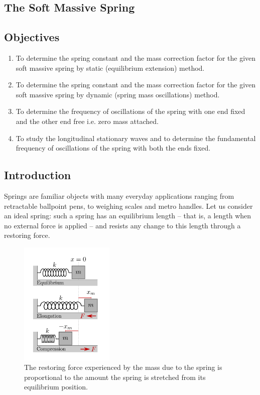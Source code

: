 \begin{refsection}
\chapter{The Soft Massive Spring}

\section*{Objectives}

\begin{enumerate}
\item To determine the spring constant and the mass correction factor for the given soft massive
spring by static (equilibrium extension) method.
\item To determine the spring constant and the mass correction factor for the given soft massive
spring by dynamic (spring mass oscillations) method.
\item To determine the frequency of oscillations of the spring with one end fixed and the other
end free i.e. zero mass attached.
\item To study the longitudinal stationary waves and to determine the fundamental frequency of
oscillations of the spring with both the ends fixed.
\end{enumerate}

\section*{Introduction}

Springs are familiar objects with many everyday applications ranging from retractable ballpoint pens, to weighing scales and metro handles. Let us consider an ideal spring: such a spring has an equilibrium length -- that is, a length when no external force is applied -- and resists any change to this length through a restoring force.


\begin{figure}[!htb]
    \centering
    \includegraphics[width=0.4\textwidth]{figs/springForce.png}
    \caption{The restoring force experienced by the mass due to the spring is proportional to the amount the spring is stretched from its equilibrium position.}
    \label{fig:springForces}
\end{figure}


\end{refsection}
